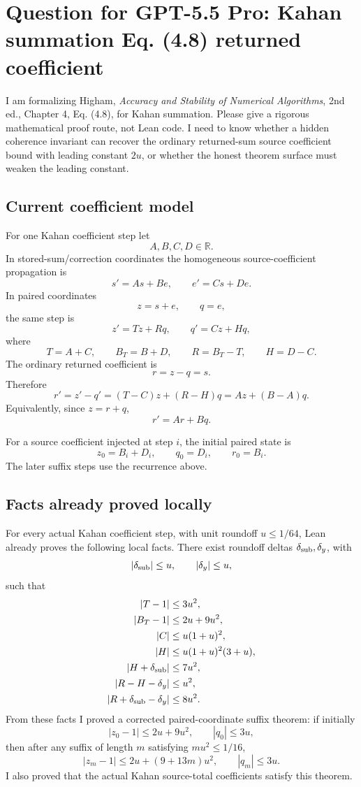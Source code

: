 \documentclass{article}
\begin{document}
\section*{Question for GPT-5.5 Pro: Kahan summation Eq. (4.8) returned coefficient}

I am formalizing Higham, \emph{Accuracy and Stability of Numerical Algorithms},
2nd ed., Chapter 4, Eq. (4.8), for Kahan summation.  Please give a rigorous
mathematical proof route, not Lean code.  I need to know whether a hidden
coherence invariant can recover the ordinary returned-sum source coefficient
bound with leading constant \(2u\), or whether the honest theorem surface must
weaken the leading constant.

\subsection*{Current coefficient model}

For one Kahan coefficient step let
\[
  A,B,C,D\in\mathbb R.
\]
In stored-sum/correction coordinates the homogeneous source-coefficient
propagation is
\[
  s' = A s + B e,\qquad e' = C s + D e.
\]
In paired coordinates
\[
  z=s+e,\qquad q=e,
\]
the same step is
\[
  z' = Tz + Rq,\qquad q' = Cz + Hq,
\]
where
\[
  T=A+C,\qquad B_T=B+D,\qquad R=B_T-T,\qquad H=D-C.
\]
The ordinary returned coefficient is
\[
  r = z-q=s.
\]
Therefore
\[
  r'=z'-q'=(T-C)z+(R-H)q=A z+(B-A)q.
\]
Equivalently, since \(z=r+q\),
\[
  r' = A r + B q.
\]

For a source coefficient injected at step \(i\), the initial paired state is
\[
  z_0=B_i+D_i,\qquad q_0=D_i,\qquad r_0=B_i.
\]
The later suffix steps use the recurrence above.

\subsection*{Facts already proved locally}

For every actual Kahan coefficient step, with unit roundoff \(u\le 1/64\), Lean
already proves the following local facts.  There exist roundoff deltas
\(\delta_{\rm sub},\delta_y\), with
\[
  |\delta_{\rm sub}|\le u,\qquad |\delta_y|\le u,
\]
such that
\[
\begin{aligned}
  |T-1| &\le 3u^2,\\
  |B_T-1| &\le 2u+9u^2,\\
  |C| &\le u(1+u)^2,\\
  |H| &\le u(1+u)^2(3+u),\\
  |H+\delta_{\rm sub}| &\le 7u^2,\\
  |R-H-\delta_y| &\le u^2,\\
  |R+\delta_{\rm sub}-\delta_y| &\le 8u^2.
\end{aligned}
\]
From these facts I proved a corrected paired-coordinate suffix theorem:
if initially
\[
  |z_0-1|\le 2u+9u^2,\qquad |q_0|\le 3u,
\]
then after any suffix of length \(m\) satisfying \(m u^2\le 1/16\),
\[
  |z_m-1|\le 2u+(9+13m)u^2,\qquad |q_m|\le 3u.
\]
I also proved that the actual Kahan source-total coefficients satisfy this
theorem.
\end{document}
